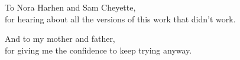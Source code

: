 
To Nora Harhen and Sam Cheyette,\\
for hearing about all the versions of this work that didn't work.

\vspace{1em}

And to my mother and father,\\
for giving me the confidence to keep trying anyway.
